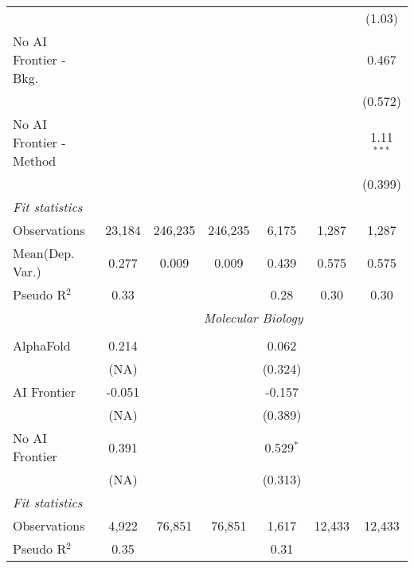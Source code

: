 \begin{tabular}{lcccccc}
                           &               &         &         &              &             & (1.03)\\   
   No AI Frontier - Bkg.   &               &         &         &              &             & 0.467\\   
                           &               &         &         &              &             & (0.572)\\   
   No AI Frontier - Method &               &         &         &              &             & 1.11$^{***}$\\   
                           &               &         &         &              &             & (0.399)\\   
   \midrule
   \emph{Fit statistics}\\
   Observations            & 23,184        & 246,235 & 246,235 & 6,175        & 1,287       & 1,287\\  
Mean(Dep. Var.) & 0.277 & 0.009 & 0.009 & 0.439 & 0.575 & 0.575 \\
   Pseudo R$^2$            & 0.33          &         &         & 0.28         & 0.30        & 0.30\\  
   
 & \multicolumn{6}{c}{\textit{Molecular Biology}} \\ \\
   AlphaFold      & 0.214      &        &        & 0.062       &        &   \\   
                  & (NA)       &        &        & (0.324)     &        &   \\   
   AI Frontier    & -0.051     &        &        & -0.157      &        &   \\   
                  & (NA)       &        &        & (0.389)     &        &   \\   
   No AI Frontier & 0.391      &        &        & 0.529$^{*}$ &        &   \\   
                  & (NA)       &        &        & (0.313)     &        &   \\   
   \midrule
   \emph{Fit statistics}\\
   Observations   & 4,922      & 76,851 & 76,851 & 1,617       & 12,433 & 12,433\\  
   Pseudo R$^2$   & 0.35       &        &        & 0.31        &        & \\  
   

\end{tabular}
